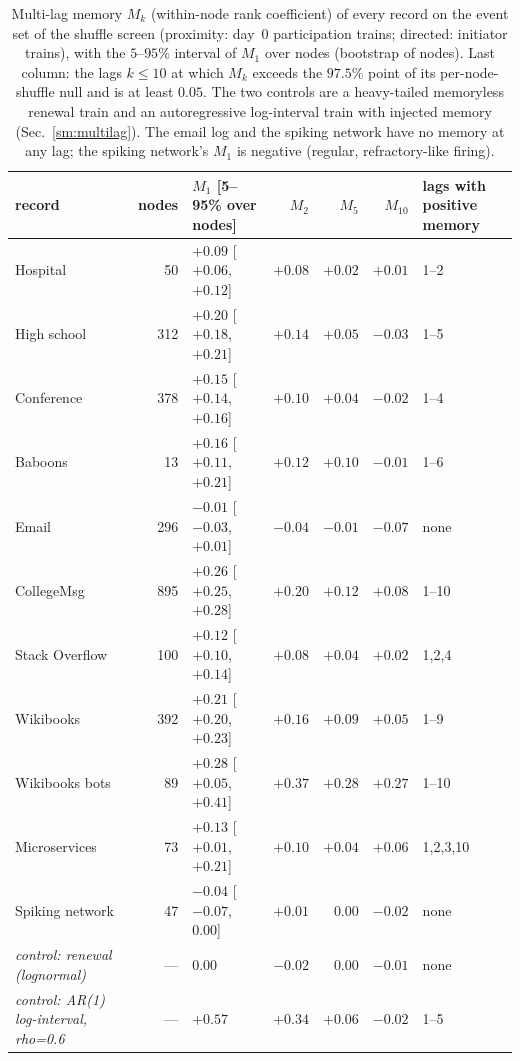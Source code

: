 \begin{table}[h]
  \centering
  \small
  \setlength{\tabcolsep}{4pt}
  \begin{tabular}{l r l r r r l}
    \toprule
    record & nodes & $M_1$ [5--95\% over nodes] & $M_2$ & $M_5$ & $M_{10}$ & lags with positive memory \\
    \midrule
    Hospital & 50 & $+0.09$ [$+0.06$, $+0.12$] & $+0.08$ & $+0.02$ & $+0.01$ & 1--2 \\
    High school & 312 & $+0.20$ [$+0.18$, $+0.21$] & $+0.14$ & $+0.05$ & $-0.03$ & 1--5 \\
    Conference & 378 & $+0.15$ [$+0.14$, $+0.16$] & $+0.10$ & $+0.04$ & $-0.02$ & 1--4 \\
    Baboons & 13 & $+0.16$ [$+0.11$, $+0.21$] & $+0.12$ & $+0.10$ & $-0.01$ & 1--6 \\
    Email & 296 & $-0.01$ [$-0.03$, $+0.01$] & $-0.04$ & $-0.01$ & $-0.07$ & none \\
    CollegeMsg & 895 & $+0.26$ [$+0.25$, $+0.28$] & $+0.20$ & $+0.12$ & $+0.08$ & 1--10 \\
    Stack Overflow & 100 & $+0.12$ [$+0.10$, $+0.14$] & $+0.08$ & $+0.04$ & $+0.02$ & 1,2,4 \\
    Wikibooks & 392 & $+0.21$ [$+0.20$, $+0.23$] & $+0.16$ & $+0.09$ & $+0.05$ & 1--9 \\
    Wikibooks bots & 89 & $+0.28$ [$+0.05$, $+0.41$] & $+0.37$ & $+0.28$ & $+0.27$ & 1--10 \\
    Microservices & 73 & $+0.13$ [$+0.01$, $+0.21$] & $+0.10$ & $+0.04$ & $+0.06$ & 1,2,3,10 \\
    Spiking network & 47 & $-0.04$ [$-0.07$, $0.00$] & $+0.01$ & $0.00$ & $-0.02$ & none \\
    \emph{control: renewal (lognormal)} & --- & $0.00$ & $-0.02$ & $0.00$ & $-0.01$ & none \\
    \emph{control: AR(1) log-interval, rho=0.6} & --- & $+0.57$ & $+0.34$ & $+0.06$ & $-0.02$ & 1--5 \\
    \bottomrule
  \end{tabular}
  \caption{Multi-lag memory $M_k$ (within-node rank coefficient) of every record on the event set of the shuffle screen (proximity: day~0 participation trains; directed: initiator trains), with the $5$--$95\%$ interval of $M_1$ over nodes (bootstrap of nodes). Last column: the lags $k\le10$ at which $M_k$ exceeds the $97.5\%$ point of its per-node-shuffle null and is at least $0.05$. The two controls are a heavy-tailed memoryless renewal train and an autoregressive log-interval train with injected memory (Sec.~\ref{sm:multilag}). The email log and the spiking network have no memory at any lag; the spiking network's $M_1$ is negative (regular, refractory-like firing).}
  \label{tab:multilag}
\end{table}
